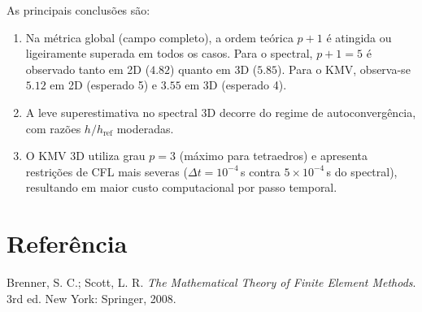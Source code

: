 \documentclass[11pt,a4paper]{article}
\begin{document}
\noindent
As principais conclus\~oes s\~ao:
\begin{enumerate}
    \item Na m\'etrica global (campo completo), a ordem te\'orica $p+1$ \'e
    atingida ou ligeiramente superada em todos os casos. Para o spectral,
    $p+1=5$ \'e observado tanto em 2D ($4.82$) quanto em 3D ($5.85$). Para o
    KMV, observa-se $5.12$ em 2D (esperado 5) e $3.55$ em 3D (esperado 4).
    \item A leve superestimativa no spectral 3D decorre do regime de
    autoconverg\^encia, com raz\~oes $h/h_{\text{ref}}$ moderadas.
    \item O KMV 3D utiliza grau $p=3$ (m\'aximo para tetraedros) e apresenta
    restri\c{c}\~oes de CFL mais severas ($\Delta t = 10^{-4}$\,s contra
    $5\times10^{-4}$\,s do spectral), resultando em maior custo
    computacional por passo temporal.
\end{enumerate}

\section*{Refer\^encia}

\noindent
[1] Brenner, S. C.; Scott, L. R. \textit{The Mathematical Theory of Finite
Element Methods}. 3rd ed. New York: Springer, 2008.
\end{document}
